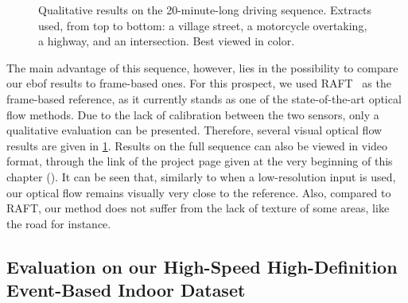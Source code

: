 \begin{figure}
\begin{tabular}{@{}ccc@{}}
  \end{tabular}
  \caption{Qualitative results on the 20-minute-long driving sequence. Extracts used, from top to bottom: a village street, a motorcycle overtaking, a highway, and an intersection. Best viewed in color.}\label{fig:ebof:results_20min}
\end{figure}

The main advantage of this sequence, however, lies in the possibility to compare our \acrshort{ebof} results to frame-based ones. For this prospect, we used RAFT~\cite{Teed2020RAFTRA} as the frame-based reference, as it currently stands as one of the state-of-the-art optical flow methods. Due to the lack of calibration between the two sensors, only a qualitative evaluation can be presented. Therefore, several visual optical flow results are given in \cref{fig:ebof:results_20min}. Results on the full sequence can also be viewed in video format, through the link of the project page given at the very beginning of this chapter (). It can be seen that, similarly to when a low-resolution input is used, our optical flow remains visually very close to the reference. Also, compared to RAFT, our method does not suffer from the lack of texture of some areas, like the road for instance.

\subsection{Evaluation on our High-Speed High-Definition Event-Based Indoor Dataset}\label{sec:ebof:eval_highspeed}

